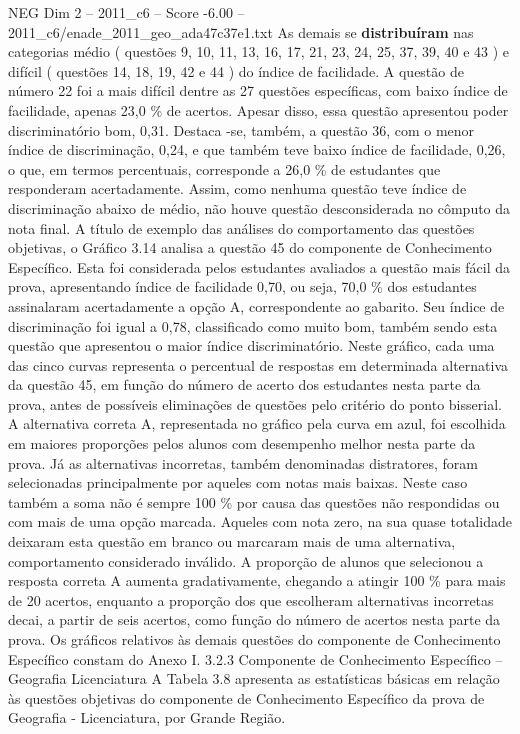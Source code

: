 \begin{textsample}{NEG Dim 2 – 2011\_c6 – Score -6.00 – 2011\_c6/enade\_2011\_geo\_ada47c37e1.txt}
As demais se \textbf{distribuíram} nas categorias médio ( questões 9, 10, 11, 13, 16, 17, 21, 23, 24, 25, 37, 39, 40 e 43 ) e difícil ( questões 14, 18, 19, 42 e 44 ) do índice de facilidade.
A questão de número 22 foi a mais difícil dentre as 27 questões específicas, com baixo índice de facilidade, apenas 23,0 \% de acertos.
Apesar disso, essa questão apresentou poder discriminatório bom, 0,31.
Destaca -se, também, a questão 36, com o menor índice de discriminação, 0,24, e que também teve baixo índice de facilidade, 0,26, o que, em termos percentuais, corresponde a 26,0 \% de estudantes que responderam acertadamente.
Assim, como nenhuma questão teve índice de discriminação abaixo de médio, não houve questão desconsiderada no cômputo da nota final.
A título de exemplo das análises do comportamento das questões objetivas, o Gráfico 3.14 analisa a questão 45 do componente de Conhecimento Específico.
Esta foi considerada pelos estudantes avaliados a questão mais fácil da prova, apresentando índice de facilidade 0,70, ou seja, 70,0 \% dos estudantes assinalaram acertadamente a opção A, correspondente ao gabarito.
Seu índice de discriminação foi igual a 0,78, classificado como muito bom, também sendo esta questão que apresentou o maior índice discriminatório.
Neste gráfico, cada uma das cinco curvas representa o percentual de respostas em determinada alternativa da questão 45, em função do número de acerto dos estudantes nesta parte da prova, antes de possíveis eliminações de questões pelo critério do ponto bisserial.
A alternativa correta A, representada no gráfico pela curva em azul, foi escolhida em maiores proporções pelos alunos com desempenho melhor nesta parte da prova.
Já as alternativas incorretas, também denominadas distratores, foram selecionadas principalmente por aqueles com notas mais baixas.
Neste caso também a soma não é sempre 100 \% por causa das questões não respondidas ou com mais de uma opção marcada.
Aqueles com nota zero, na sua quase totalidade deixaram esta questão em branco ou marcaram mais de uma alternativa, comportamento considerado inválido.
A proporção de alunos que selecionou a resposta correta A aumenta gradativamente, chegando a atingir 100 \% para mais de 20 acertos, enquanto a proporção dos que escolheram alternativas incorretas decai, a partir de seis acertos, como função do número de acertos nesta parte da prova.
Os gráficos relativos às demais questões do componente de Conhecimento Específico constam do Anexo I. 3.2.3 Componente de Conhecimento Específico – Geografia Licenciatura A Tabela 3.8 apresenta as estatísticas básicas em relação às questões objetivas do componente de Conhecimento Específico da prova de Geografia - Licenciatura, por Grande Região.

\end{textsample}
